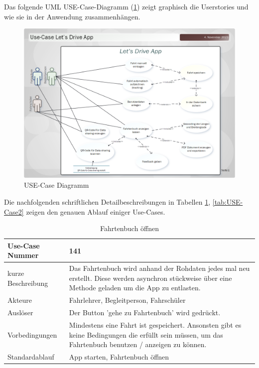 Das folgende UML USE-Case-Diagramm (\ref{fig:USE-Case-Diagramm}) zeigt graphisch die Userstories und wie sie in der Anwendung zusammenhängen.

\begin{figure}[H]
	\centering
	\includegraphics[width=15cm]{figures/usecase_diagramm.png}
	\caption{USE-Case Diagramm}
	\label{fig:USE-Case-Diagramm}
\end{figure}

Die nachfolgenden schriftlichen Detailbeschreibungen in Tabellen \ref{tab:USE-Case1}, \ref{tab:USE-Case2} zeigen den genauen Ablauf einiger Use-Cases.
\begin{table}[H]
	\centering
	\begin{tabularx}{\textwidth}{|l|X|}
		\hline
		Use-Case Nummer & 141 \\
		\hline
		kurze Beschreibung & Das Fahrtenbuch wird anhand der Rohdaten jedes mal neu erstellt. Diese werden asynchron stückweise über eine Methode geladen um die App zu entlasten.   \\
		\hline
		Akteure &  Fahrlehrer, Begleitperson, Fahrschüler\\
		\hline
		Auslöser & Der Button 'gehe zu Fahrtenbuch' wird gedrückt. \\
		\hline
		Vorbedingungen & Mindestens eine Fahrt ist gespeichert. Ansonsten gibt es keine Bedingungen die erfüllt sein müssen, um das Fahrtenbuch benutzen / anzeigen zu können. \\
		\hline
		Standardablauf & App starten, Fahrtenbuch öffnen \\
		\hline
	\end{tabularx}
	\caption{Fahrtenbuch öffnen}
	\label{tab:USE-Case1}
\end{table}

